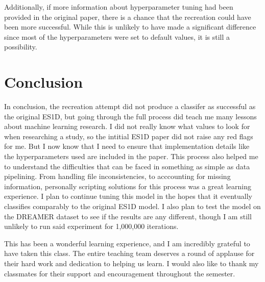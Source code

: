 Additionally, if more information about hyperparameter tuning had been provided in the original paper, there is a chance that the recreation could have been more successful.
While this is unlikely to have made a significant difference since most of the hyperparameters were set to default values, it is still a possibility.
\section{Conclusion}
In conclusion, the recreation attempt did not produce a classifer as successful as the original ES1D, but going through the full process did teach me many lessons about machine learning research.
I did not really know what values to look for when researching a study, so the intitial ES1D paper did not raise any red flags for me.
But I now know that I need to ensure that implementation details like the hyperparameters used are included in the paper.
This process also helped me to understand the difficulties that can be faced in something as simple as data pipelining.
From handling file inconsistencies, to acccounting for missing information, personally scripting solutions for this process was a great learning experience.
I plan to continue tuning this model in the hopes that it eventually classifies comparably to the original ES1D model.
I also plan to test the model on the DREAMER dataset to see if the results are any different, though I am still unlikely to run said experiment for 1,000,000 iterations.

This has been a wonderful learning experience, and I am incredibly grateful to have taken this class. 
The entire teaching team deserves a round of applause for their hard work and dedication to helping us learn.
I would also like to thank my classmates for their support and encouragement throughout the semester.